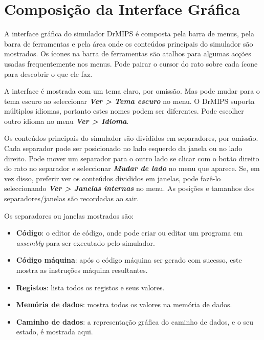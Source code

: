 \documentclass[11pt,a4paper,twoside,titlepage]{article}
\author{Bruno Nova}
\title{\Title}
\newcommand{\menupath}[1]{\textbf{\emph{#1}}}
\begin{document}
\maketitle
\tableofcontents
\newpage

\section{Composição da Interface Gráfica}

A interface gráfica do simulador DrMIPS é composta pela barra de menus, pela
barra de ferramentas e pela área onde os conteúdos principais do simulador são
mostrados.
Os ícones na barra de ferramentas são atalhos para algumas acções usadas
frequentemente nos menus. Pode pairar o cursor do rato sobre cada ícone para
descobrir o que ele faz.

A interface é mostrada com um tema claro, por omissão. Mas pode mudar para o
tema escuro ao seleccionar \menupath{Ver > Tema escuro} no menu.
O DrMIPS suporta múltiplos idiomas, portanto estes nomes podem ser diferentes.
Pode escolher outro idioma no menu \menupath{Ver > Idioma}.

Os conteúdos principais do simulador são divididos em separadores, por omissão.
Cada separador pode ser posicionado no lado esquerdo da janela ou no lado 
direito.
Pode mover um separador para o outro lado se clicar com o botão direito do rato
no separador e seleccionar \menupath{Mudar de lado} no menu que aparece.
Se, em vez disso, preferir ver os conteúdos divididos em janelas, pode fazê-lo
seleccionando \menupath{Ver > Janelas internas} no menu.
As posições e tamanhos dos separadores/janelas são recordadas ao sair.

Os separadores ou janelas mostrados são:
\begin{itemize}
	\item \textbf{Código}: o editor de código, onde pode criar ou editar um
		programa em \emph{assembly} para ser executado pelo simulador.
	\item \textbf{Código máquina}: após o código máquina ser gerado com sucesso,
		este mostra as instruções máquina resultantes.
	\item \textbf{Registos}: lista todos os registos e seus valores.
	\item \textbf{Memória de dados}: mostra todos os valores na memória de 
		dados.
	\item \textbf{Caminho de dados}: a representação gráfica do caminho de
		dados, e o seu estado, é mostrada aqui.
\end{itemize}
\end{document}
